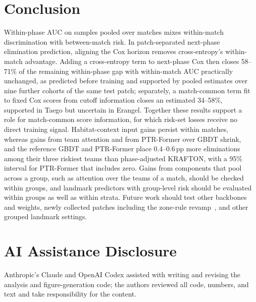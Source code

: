 \documentclass[sigconf,anonymous]{acmart}
\begin{document}
\section{Conclusion}
\label{sec:conclusion}
Within-phase AUC on samples pooled over matches mixes within-match discrimination with between-match risk. In patch-separated next-phase elimination prediction, aligning the Cox horizon removes cross-entropy's within-match advantage. Adding a cross-entropy term to next-phase Cox then closes 58--71\% of the remaining within-phase gap with within-match AUC practically unchanged, as predicted before training and supported by pooled estimates over nine further cohorts of the same test patch; separately, a match-common term fit to fixed Cox scores from cutoff information closes an estimated 34--58\%, supported in Taego but uncertain in Erangel. Together these results support a role for match-common score information, for which risk-set losses receive no direct training signal. Habitat-context input gains persist within matches, whereas gains from team attention and from PTR-Former over GBDT shrink, and the reference GBDT and PTR-Former place 0.4--0.6\,pp more eliminations among their three riskiest teams than phase-adjusted KRAFTON, with a 95\% interval for PTR-Former that includes zero. Gains from components that pool across a group, such as attention over the teams of a match, should be checked within groups, and landmark predictors with group-level risk should be evaluated within groups as well as within strata. Future work should test other backbones and weights, newly collected patches including the zone-rule revamp~\cite{PUBGBlueZone2026}, and other grouped landmark settings.

\section*{AI Assistance Disclosure}
Anthropic's Claude and OpenAI Codex assisted with writing and revising the analysis and figure-generation code; the authors reviewed all code, numbers, and text and take responsibility for the content.



\end{document}
